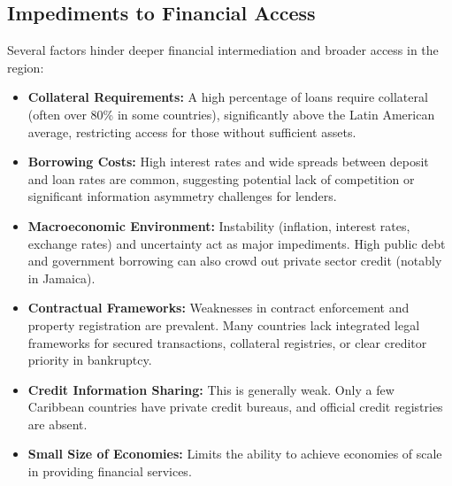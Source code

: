 \subsection{Impediments to Financial Access}
Several factors hinder deeper financial intermediation and broader access in the region:
\begin{itemize}
    \item \textbf{Collateral Requirements:} A high percentage of loans require collateral (often over 80\% in some countries), significantly above the Latin American average, restricting access for those without sufficient assets.
    \item \textbf{Borrowing Costs:} High interest rates and wide spreads between deposit and loan rates are common, suggesting potential lack of competition or significant information asymmetry challenges for lenders.
    \item \textbf{Macroeconomic Environment:} Instability (inflation, interest rates, exchange rates) and uncertainty act as major impediments. High public debt and government borrowing can also crowd out private sector credit (notably in Jamaica).
    \item \textbf{Contractual Frameworks:} Weaknesses in contract enforcement and property registration are prevalent. Many countries lack integrated legal frameworks for secured transactions, collateral registries, or clear creditor priority in bankruptcy.
    \item \textbf{Credit Information Sharing:} This is generally weak. Only a few Caribbean countries have private credit bureaus, and official credit registries are absent.
    \item \textbf{Small Size of Economies:} Limits the ability to achieve economies of scale in providing financial services.
\end{itemize}

